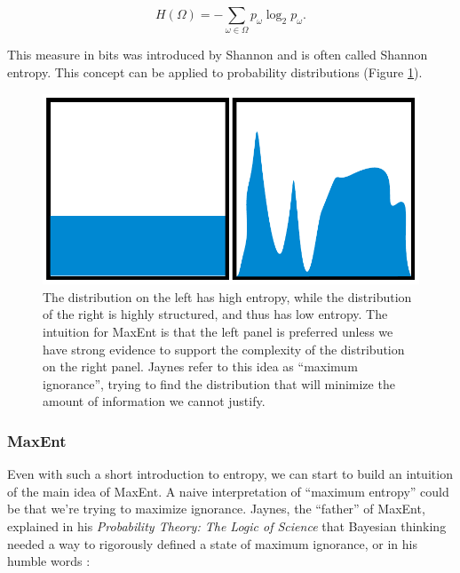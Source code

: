 \documentclass[letterpaper,12pt]{article}
\begin{document}
\begin{equation}
   H(\Omega) = -\sum_{\omega \in \Omega} p_\omega \log_2 p_\omega.
\end{equation}

This measure in bits was introduced by Shannon \cite{sha48,ash65} and is
often called Shannon entropy. This concept can be applied to probability
distributions (Figure \ref{fig:entropy_dist}).

\begin{figure}[h!]
  \centering\includegraphics[width=1.0\textwidth]{entropy_dist.pdf}

  \caption{The distribution on the left has high entropy, while the distribution
  of the right is highly structured, and thus has low entropy. The intuition
  for MaxEnt is that the left panel is preferred unless we have strong evidence
  to support the complexity of the distribution on the right panel. Jaynes
  refer to this idea as ``maximum ignorance'', trying to find the distribution
  that will minimize the amount of information we cannot justify.}

  \label{fig:entropy_dist}
\end{figure}

\subsubsection{MaxEnt}

Even with such a short introduction to entropy, we can start to build an
intuition of the main idea of MaxEnt. A naive interpretation of ``maximum
entropy'' could be that we're trying to maximize ignorance. Jaynes, the
``father'' of MaxEnt, explained in his \emph{Probability Theory: The Logic
of Science} that Bayesian thinking needed a way to rigorously defined a
state of maximum ignorance, or in his humble words \cite[chpt. 12]{jay03}:
\end{document}
